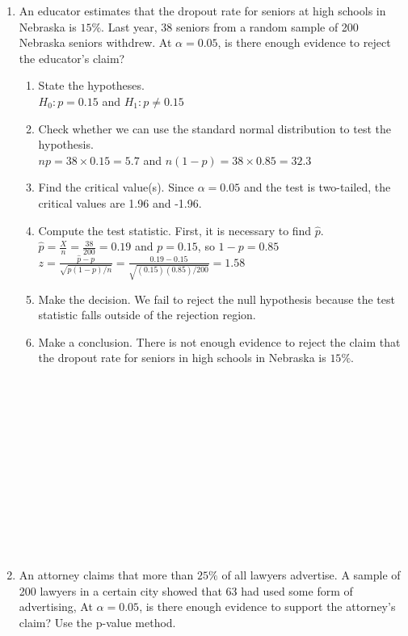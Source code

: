 \documentclass[12pt]{article}
\begin{document}
\begin{enumerate}
\item An educator estimates that the dropout rate for seniors at high schools in Nebraska is $15\%$. Last year, 38 seniors from a random sample of 200 Nebraska seniors withdrew. At $\alpha=0.05$, is there enough evidence to reject the educator's claim?
\begin{enumerate}
\item State the hypotheses.\\
$H_0:p=0.15$ and $H_1:p\neq 0.15$
\item Check whether we can use the standard normal distribution to test the hypothesis.\\
$np=38\times 0.15=5.7$ and $n(1-p)=38\times 0.85=32.3$
\item Find the critical value(s). Since $\alpha=0.05$ and the test is two-tailed, the critical values are 1.96 and -1.96.
\item Compute the test statistic. First, it is necessary to find $\hat{p}$.\\
$\hat{p}=\frac{X}{n}=\frac{38}{200}=0.19$ and $p=0.15$, so $1-p=0.85$\\
$z=\frac{\hat{p}-p}{\sqrt{p(1-p)/n}}=\frac{0.19-0.15}{\sqrt{(0.15)(0.85)/200}}=1.58$
\item Make the decision. We fail to reject the null hypothesis because the test statistic falls outside of the rejection region.
\item Make a conclusion. There is not enough evidence to reject the claim that the dropout rate for seniors in high schools in Nebraska is $15\%$.\\
\\
\\
\\
\\
\\
\\
\\
\\
\\
\\
\\
\\
\end{enumerate}
\item An attorney claims that more than $25\%$ of all lawyers advertise. A sample of 200 lawyers in a certain city showed that 63 had used some form of advertising, At $\alpha=0.05$, is there enough evidence to support the attorney's claim? Use the p-value method.
\begin{enumerate}

\end{enumerate}
\end{enumerate}
\end{document}
